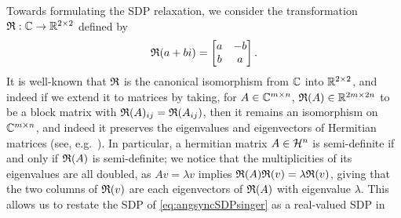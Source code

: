 Towards formulating the SDP relaxation, we consider the transformation $\mathfrak{R} : \mathbb{C} \to \mathbb{R}^{2 \times 2}$ %
defined by \[\mathfrak{R}(a + bi) = \begin{bmatrix} a & -b \\ b & a \end{bmatrix}.\]
It is well-known that $\mathfrak{R}$ is the canonical isomorphism from $\mathbb{C}$ into $\mathbb{R}^{2 \times 2}$, and indeed if we extend it to matrices by taking, for $A \in \mathbb{C}^{m \times n}$, $\mathfrak{R}(A) \in \mathbb{R}^{2m \times 2n}$ to be a block matrix with $\mathfrak{R}(A)_{ij} = \mathfrak{R}(A_{ij})$, then it remains an isomorphism on $\mathbb{C}^{m \times n}$, and indeed it preserves the eigenvalues and eigenvectors of Hermitian matrices (see, e.g.~\cite[p.~101]{wedderburn1934matrices}).  In particular, a hermitian matrix $A \in \mathcal{H}^n$ is semi-definite if and only if $\mathfrak{R}(A)$ is semi-definite; we notice that the multiplicities of its eigenvalues are all doubled, as $A v = \lambda v$ implies $\mathfrak{R}(A) \mathfrak{R}(v) = \lambda \mathfrak{R}(v)$, giving that the two columns of $\mathfrak{R}(v)$ are each eigenvectors of $\mathfrak{R}(A)$ with eigenvalue $\lambda$.  This allows us to restate the SDP of \eqref{eq:angsyncSDPsinger} as a real-valued SDP in 
